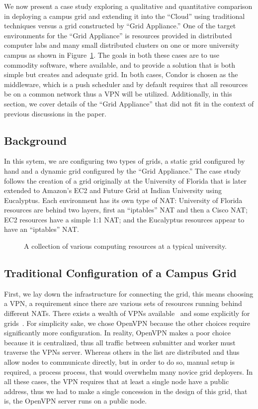\documentclass[conference]{IEEEtran}
\begin{document}
We now present a case study exploring a qualitative and quantitative comparison
in deploying a campus grid and extending it into the ``Cloud'' using
traditional techniques versus a grid constructed by ``Grid Appliance.''  One of
the target environments for the ``Grid Appliance'' is resources provided in
distributed computer labs and many small distributed clusters on one or more
university campus as shown in Figure~\ref{fig:unconnected}.  The goals in both
these cases are to use commodity software, where available, and to provide a
solution that is both simple but creates and adequate grid.  In both cases,
Condor is chosen as the middleware, which is a push scheduler and by default
requires that all resources be on a common network thus a VPN will be utilized.
Additionally, in this section, we cover details of the ``Grid Appliance'' that
did not fit in the context of previous discussions in the paper.

\subsection{Background}

In this sytem, we are configuring two types of grids, a static grid configured
by hand and a dynamic grid configured by the ``Grid Appliance.''  The case
study follows the creation of a grid originally at the University of Florida
that is later extended to Amazon's EC2 and Future Grid at Indian University
using Eucalyptus.  Each environment has its own type of NAT:  University of
Florida resources are behind two layers, first an ``iptables'' NAT and then a
Cisco NAT; EC2 resources have a simple 1:1 NAT; and the Eucalyptus resources
appear to have an ``iptables'' NAT.

\begin{figure}[ht]
\centering
{}
\caption{A collection of various computing resources at a typical university.}
\label{fig:unconnected}
\end{figure}

\subsection{Traditional Configuration of a Campus Grid}

First, we lay down the infrastructure for connecting the grid, this means
choosing a VPN, a requirement since there are various sets of resources running
behind different NATs.  There exists a wealth of VPNs available~\cite{hamachi,
openvpn, tinc} and some explicitly for grids~\cite{violin, vine, vnet}.  For
simplicity sake, we chose OpenVPN because the other choices require
significantly more configuration.  In reality, OpenVPN makes a poor choice
because it is centralized, thus all traffic between submitter and worker must
traverse the VPNs server.  Whereas others in the list are distributed and thus
allow nodes to communicate directly, but in order to do so, manual setup is
required, a process process, that would overwhelm many novice grid deployers.
In all these cases, the VPN requires that at least a single node have a public
address, thus we had to make a single concession in the design of this grid,
that is, the OpenVPN server runs on a public node.
\end{document}
